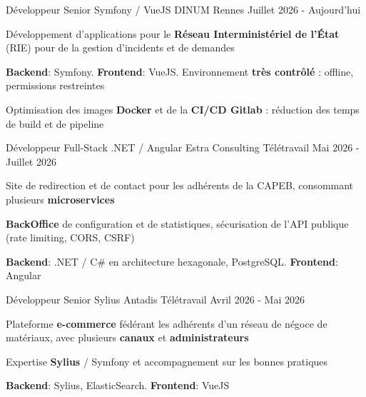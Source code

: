 

\begin{cventries}
	\cventry
	{Développeur Senior Symfony / VueJS} %
	{DINUM} %
	{Rennes} %
	{Juillet 2026 - Aujourd'hui} %
	{
		\begin{cvitems} %
			\item {Développement d'applications pour le \textbf{Réseau Interministériel de l'État} (RIE) pour de la gestion d'incidents et de demandes}
			\item {\textbf{Backend}: Symfony. \textbf{Frontend}: VueJS. Environnement \textbf{très contrôlé} : offline, permissions restreintes}
			\item {Optimisation des images \textbf{Docker} et de la \textbf{CI/CD Gitlab} : réduction des temps de build et de pipeline}
		\end{cvitems}
	}

	\cventry
	{Développeur Full-Stack .NET / Angular} %
	{Estra Consulting} %
	{Télétravail} %
	{Mai 2026 - Juillet 2026} %
	{
		\begin{cvitems} %
			\item {Site de redirection et de contact pour les adhérents de la CAPEB, consommant plusieurs \textbf{microservices}}
			\item {\textbf{BackOffice} de configuration et de statistiques, sécurisation de l'API publique (rate limiting, CORS, CSRF)}
			\item {\textbf{Backend}: .NET / C\# en architecture hexagonale, PostgreSQL. \textbf{Frontend}: Angular}
		\end{cvitems}
	}

	\cventry
	{Développeur Senior Sylius} %
	{Antadis} %
	{Télétravail} %
	{Avril 2026 - Mai 2026} %
	{
		\begin{cvitems} %
			\item {Plateforme \textbf{e-commerce} fédérant les adhérents d'un réseau de négoce de matériaux, avec plusieurs \textbf{canaux} et \textbf{administrateurs}}
			\item {Expertise \textbf{Sylius} / Symfony et accompagnement sur les bonnes pratiques}
			\item {\textbf{Backend}: Sylius, ElasticSearch. \textbf{Frontend}: VueJS}
		\end{cvitems}
	}


\end{cventries}
